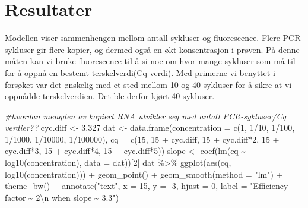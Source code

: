 \documentclass[
]{book}
\newenvironment{Shaded}{\begin{snugshade}}{\end{snugshade}}
\newcommand{\AttributeTok}[1]{\textcolor[rgb]{0.77,0.63,0.00}{#1}}
\newcommand{\CommentTok}[1]{\textcolor[rgb]{0.56,0.35,0.01}{\textit{#1}}}
\newcommand{\DecValTok}[1]{\textcolor[rgb]{0.00,0.00,0.81}{#1}}
\newcommand{\FloatTok}[1]{\textcolor[rgb]{0.00,0.00,0.81}{#1}}
\newcommand{\FunctionTok}[1]{\textcolor[rgb]{0.00,0.00,0.00}{#1}}
\newcommand{\NormalTok}[1]{#1}
\newcommand{\OtherTok}[1]{\textcolor[rgb]{0.56,0.35,0.01}{#1}}
\newcommand{\SpecialCharTok}[1]{\textcolor[rgb]{0.00,0.00,0.00}{#1}}
\newcommand{\StringTok}[1]{\textcolor[rgb]{0.31,0.60,0.02}{#1}}
\begin{document}
\hypertarget{resultater-1}{%
\section{Resultater}\label{resultater-1}}

Modellen viser sammenhengen mellom antall sykluser og fluorescence.
Flere PCR-sykluser gir flere kopier, og dermed også en økt konsentrasjon i prøven.
På denne måten kan vi bruke fluorescence til å si noe om hvor mange sykluser som må til for å oppnå en bestemt terskelverdi(Cq-verdi).
Med primerne vi benyttet i forsøket var det ønskelig med et sted mellom 10 og 40 sykluser for å sikre at vi oppnådde terskelverdien. Det ble derfor kjørt 40 sykluser.

\begin{Shaded}
\begin{Highlighting}[]
\CommentTok{\#hvordan mengden av kopiert RNA utvikler seg med antall PCR{-}sykluser/Cq verdier??}
\NormalTok{cyc.diff }\OtherTok{\textless{}{-}} \FloatTok{3.327}
\NormalTok{dat }\OtherTok{\textless{}{-}} \FunctionTok{data.frame}\NormalTok{(}\AttributeTok{concentration =} \FunctionTok{c}\NormalTok{(}\DecValTok{1}\NormalTok{, }\DecValTok{1}\SpecialCharTok{/}\DecValTok{10}\NormalTok{, }\DecValTok{1}\SpecialCharTok{/}\DecValTok{100}\NormalTok{, }\DecValTok{1}\SpecialCharTok{/}\DecValTok{1000}\NormalTok{, }\DecValTok{1}\SpecialCharTok{/}\DecValTok{10000}\NormalTok{, }\DecValTok{1}\SpecialCharTok{/}\DecValTok{100000}\NormalTok{), }
           \AttributeTok{cq =} \FunctionTok{c}\NormalTok{(}\DecValTok{15}\NormalTok{, }
                  \DecValTok{15} \SpecialCharTok{+}\NormalTok{ cyc.diff,}
                  \DecValTok{15} \SpecialCharTok{+}\NormalTok{ cyc.diff}\SpecialCharTok{*}\DecValTok{2}\NormalTok{, }
                  \DecValTok{15} \SpecialCharTok{+}\NormalTok{ cyc.diff}\SpecialCharTok{*}\DecValTok{3}\NormalTok{, }
                  \DecValTok{15} \SpecialCharTok{+}\NormalTok{ cyc.diff}\SpecialCharTok{*}\DecValTok{4}\NormalTok{, }
                  \DecValTok{15} \SpecialCharTok{+}\NormalTok{ cyc.diff}\SpecialCharTok{*}\DecValTok{5}\NormalTok{)) }
\NormalTok{slope }\OtherTok{\textless{}{-}} \FunctionTok{coef}\NormalTok{(}\FunctionTok{lm}\NormalTok{(cq }\SpecialCharTok{\textasciitilde{}} \FunctionTok{log10}\NormalTok{(concentration), }\AttributeTok{data =}\NormalTok{ dat))[}\DecValTok{2}\NormalTok{]}
\NormalTok{dat }\SpecialCharTok{\%\textgreater{}\%}
  \FunctionTok{ggplot}\NormalTok{(}\FunctionTok{aes}\NormalTok{(cq, }\FunctionTok{log10}\NormalTok{(concentration)))  }\SpecialCharTok{+} 
  \FunctionTok{geom\_point}\NormalTok{() }\SpecialCharTok{+} \FunctionTok{geom\_smooth}\NormalTok{(}\AttributeTok{method =} \StringTok{"lm"}\NormalTok{) }\SpecialCharTok{+} 
  \FunctionTok{theme\_bw}\NormalTok{() }\SpecialCharTok{+} 
  \FunctionTok{annotate}\NormalTok{(}\StringTok{"text"}\NormalTok{, }\AttributeTok{x =} \DecValTok{15}\NormalTok{, }\AttributeTok{y =} \SpecialCharTok{{-}}\DecValTok{3}\NormalTok{, }\AttributeTok{hjust =} \DecValTok{0}\NormalTok{, }\AttributeTok{label =} \StringTok{"Efficiency factor \textasciitilde{} 2}\SpecialCharTok{\textbackslash{}n}\StringTok{ when slope \textasciitilde{} 3.3"}\NormalTok{)}
\end{Highlighting}
\end{Shaded}
\end{document}
